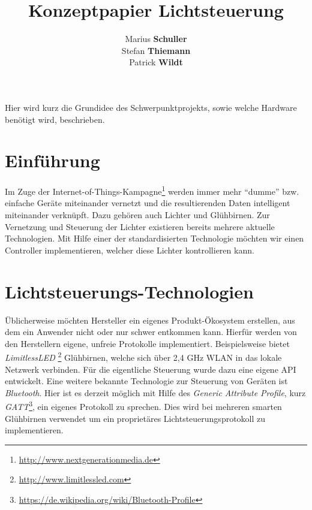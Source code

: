 \documentclass[a4paper,12pt]{article}
\begin{document}
\title{Konzeptpapier Lichtsteuerung}
\author{Marius \textbf{Schuller}\\
        Stefan \textbf{Thiemann}\\
		Patrick \textbf{Wildt}}
\maketitle

\tableofcontents

\newpage

\noindent
Hier wird kurz die Grundidee des Schwerpunktprojekts, sowie welche Hardware 
benötigt wird, beschrieben.

\section{Einführung}
\label{einfuehrung}

Im Zuge der Internet-of-Things-Kampagne\footnote{\url{http://www.nextgenerationmedia.de}}
werden immer mehr ``dumme'' bzw. einfache Geräte miteinander vernetzt und die
resultierenden Daten intelligent miteinander verknüpft. Dazu gehören auch Lichter und
Glühbirnen. Zur Vernetzung und Steuerung der Lichter existieren bereits mehrere
aktuelle Technologien. Mit Hilfe einer der standardisierten Technologie möchten wir
einen Controller implementieren, welcher diese Lichter kontrollieren kann.

\section{Lichtsteuerungs-Technologien}
\label{technology}

Üblicherweise möchten Hersteller ein eigenes Produkt-Ökosystem erstellen, aus dem ein
Anwender nicht oder nur schwer entkommen kann. Hierfür werden von den Herstellern
eigene, unfreie Protokolle implementiert. Beispielsweise bietet \textit{LimitlessLED}
\footnote{\url{http://www.limitlessled.com}} Glühbirnen, welche sich
über 2,4 GHz WLAN in das lokale Netzwerk verbinden. Für die eigentliche
Steuerung wurde dazu eine eigene API entwickelt. Eine weitere bekannte Technologie
zur Steuerung von Geräten ist \textit{Bluetooth}. Hier ist es derzeit möglich
mit Hilfe des \textit{Generic Attribute Profile}, kurz
\textit{GATT}\footnote{\url{https://de.wikipedia.org/wiki/Bluetooth-Profile}},
ein eigenes Protokoll zu sprechen. Dies wird bei mehreren smarten Glühbirnen
verwendet um ein proprietäres Lichtsteuerungsprotokoll zu implementieren.
\end{document}
